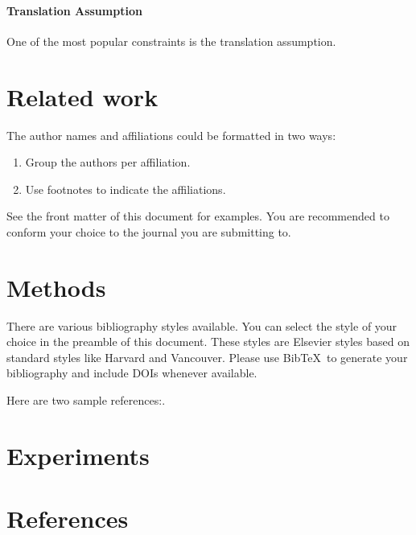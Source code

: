 \documentclass[twocolumn,a4paper,10pt,review,3p]{elsarticle}
\begin{document}
\paragraph{Translation Assumption} One of the most popular constraints is the translation assumption. 


\section{Related work}

The author names and affiliations could be formatted in two ways:
\begin{enumerate}[(1)]
\item Group the authors per affiliation.
\item Use footnotes to indicate the affiliations.
\end{enumerate}
See the front matter of this document for examples. You are recommended to conform your choice to the journal you are submitting to.

\section{Methods}

There are various bibliography styles available. You can select the style of your choice in the preamble of this document. These styles are Elsevier styles based on standard styles like Harvard and Vancouver. Please use Bib\TeX\ to generate your bibliography and include DOIs whenever available.

Here are two sample references:\cite{Feynman1963118,Dirac1953888}.

\section{Experiments}

\section*{References}


\end{document}
